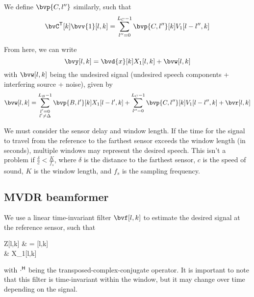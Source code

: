 We define $\bvp{C,l''}$ similarly, such that
\begin{equation}
	\tr{\bvC}[k] \bvv{1}[l,k] = \sum_{l''=0}^{L_C-1} \bvp{C,l''}[k] V_1[l-l'',k]
\end{equation}

From here, we can write
\begin{equation}
	\bvy[l,k] = \bvd{x}[k] X_1[l,k] + \bvw[l,k]
\end{equation}
with $\bvw[l,k]$ being the undesired signal (undesired speech components + interfering source + noise), given by
\begin{equation}
	\bvw[l,k] = \sum_{\substack{l'=0 \\ l' \neq \Delta}}^{L_B-1} \bvp{B,l'}[k] X_1[l-l',k] + \sum_{l''=0}^{L_C-1}\bvp{C,l''}[k] V_1[l-l'',k] + \bvr[l,k]
\end{equation}

We must consider the sensor delay and window length. If the time for the signal to travel from the reference to the farthest sensor exceeds the window length (in seconds), multiple windows may represent the desired speech. This isn't a problem if $\frac{\delta}{c} < \frac{K}{f_s}$, where $\delta$ is the distance to the farthest sensor, $c$ is the speed of sound, $K$ is the window length, and $f_s$ is the sampling frequency.

\subsection{MVDR beamformer}

We use a linear time-invariant filter $\bvf[l,k]$ to estimate the desired signal at the reference sensor, such that
\begin{equations}
	Z[l,k]
	& = \he{\bvf}[l,k] \bvy[l,k] \\
	& \approx X_1[l,k]
\end{equations}
with $\cdot^{\mathsf{H}}$ being the transposed-complex-conjugate operator. It is important to note that this filter is time-invariant within the window, but it may change over time depending on the signal.


